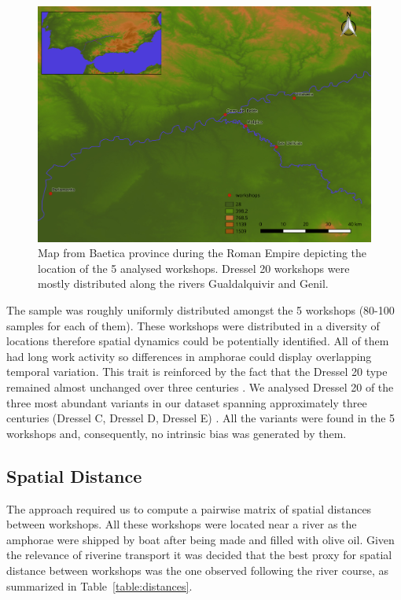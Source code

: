 \documentclass[review]{elsarticle}
\begin{document}
\begin{figure}[htp]
	\centering
\includegraphics[width=\linewidth]{figs/romanworkshop}
\caption{Map from Baetica province during the Roman Empire depicting the location of the 5 analysed workshops. Dressel 20 workshops were mostly distributed along the rivers Gualdalquivir and Genil.}
\label{romanworkshop}
\end{figure} 

The sample was roughly uniformly distributed amongst the 5 workshops (80-100 samples for each of them). These workshops were distributed in a diversity of locations therefore spatial dynamics could be potentially identified. All of them had long work activity so differences in amphorae could display overlapping temporal variation. This trait is reinforced by the fact that the Dressel 20 type remained almost unchanged over three centuries \citep{berni_dressel_2016}. We analysed Dressel 20 of the three most abundant variants in our dataset spanning approximately three centuries (Dressel C, Dressel D, Dressel E) \citep{martin-kilcher_romischen_1994,berni_millet_epigrafianforica_2008}. All the variants were found in the 5 workshops and, consequently, no intrinsic bias was generated by them. 

\subsection{Spatial Distance}

The approach required us to compute a pairwise matrix of spatial distances between workshops. All these workshops were located near a river as the amphorae were shipped by boat after being made and filled with olive oil. Given the relevance of riverine transport it was decided that the best proxy for spatial distance between workshops was the one observed following the river course, as summarized in Table~\ref{table:distances}.
\end{document}
